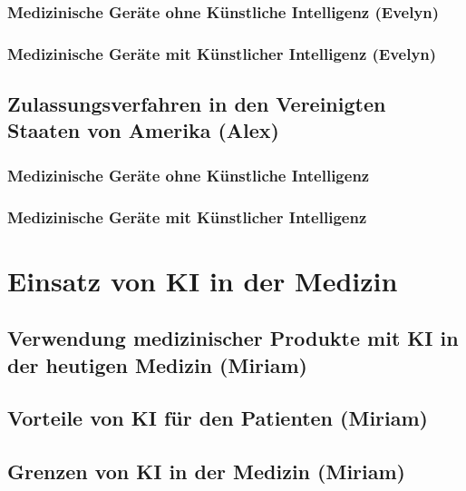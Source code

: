 \documentclass[a4paper, 11pt]{article}
\begin{document}
			\subsubsection{Medizinische Geräte ohne Künstliche Intelligenz \small{(Evelyn)}}\label{sec:europe-no-ai}
				
			\subsubsection{Medizinische Geräte mit Künstlicher Intelligenz \small{(Evelyn)}}\label{sec:europe-with-ai}
				
		\subsection{Zulassungsverfahren in den Vereinigten Staaten von Amerika \small{(Alex)}}\label{sec:us}
			
			\subsubsection{Medizinische Geräte ohne Künstliche Intelligenz}\label{sec:us-no-ai}
				
			\subsubsection{Medizinische Geräte mit Künstlicher Intelligenz}\label{sec:us-with-ai}
				

	\newpage
	\section{Einsatz von KI in der Medizin}\label{sec:analysis}
				
			\subsection{Verwendung medizinischer Produkte mit KI in der heutigen Medizin \small{(Miriam)}}\label{sec:ki-today}
				
			\subsection{Vorteile von KI für den Patienten \small{(Miriam)}}\label{sec:ki-advantages}
				
			\subsection{Grenzen von KI in der Medizin  \small{(Miriam)}}\label{sec:ki-limitations}
				
	\newpage
\end{document}
